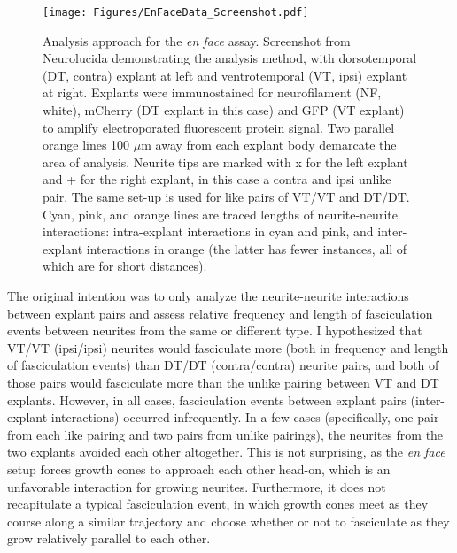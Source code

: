 \begin{figure}[hbtp]
    \begin{center}
        \texttt{[image: Figures/EnFaceData\_Screenshot.pdf]}
        \caption[Analysis approach for the \emph{en face} assay.]
        {Analysis approach for the \emph{en face} assay.
        Screenshot from Neurolucida demonstrating the analysis method, with dorsotemporal (DT, contra) explant at left and ventrotemporal (VT, ipsi) explant at right.
        Explants were immunostained for neurofilament (NF, white), mCherry (DT explant in this case) and GFP (VT explant) to amplify electroporated fluorescent protein signal.
        Two parallel orange lines 100 $\mu$m away from each explant body demarcate the area of analysis.
        Neurite tips are marked with x for the left explant and + for the right explant, in this case a contra and ipsi unlike pair.
        The same set-up is used for like pairs of VT/VT and DT/DT.
        Cyan, pink, and orange lines are traced lengths of neurite-neurite interactions: intra-explant interactions in cyan and pink, and inter-explant interactions in orange (the latter has fewer instances, all of which are for short distances).}
        \label{EnFaceDataScreenshot}
    \end{center}
\end{figure}

The original intention was to only analyze the neurite-neurite interactions between explant pairs and assess relative frequency and length of fasciculation events between neurites from the same or different type.
I hypothesized that VT/VT (ipsi/ipsi) neurites would fasciculate more (both in frequency and length of fasciculation events) than DT/DT (contra/contra) neurite pairs, and both of those pairs would fasciculate more than the unlike pairing between VT and DT explants.
However, in all cases, fasciculation events between explant pairs (inter-explant interactions) occurred infrequently.
In a few cases (specifically, one pair from each like pairing and two pairs from unlike pairings), the neurites from the two explants avoided each other altogether.
This is not surprising, as the \emph{en face} setup forces growth cones to approach each other head-on, which is an unfavorable interaction for growing neurites.
Furthermore, it does not recapitulate a typical \invivo{} fasciculation event, in which growth cones meet as they course along a similar trajectory and choose whether or not to fasciculate as they grow relatively parallel to each other.

